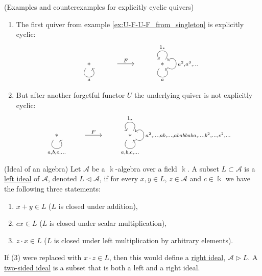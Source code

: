 \begin{example}{(Examples and counterexamples for explicitly cyclic quivers)}
\begin{enumerate}
not explicitly cyclic.
\item The first quiver from example \ref{ex:U-F-U-F_from_singleton} is explicitly cyclic:\\
\[
\begin{tikzcd}
\ast \arrow["a"', loop, distance=2em, in=305, out=235] & {} \arrow[r, "F"] & {} & \ast \arrow["a"', loop, distance=2em, in=305, out=235] \arrow["1_{\ast}"', loop, distance=2em, in=125, out=55] \arrow["{{a^{2}, a^{3},\dots}}"', loop, distance=2em, in=35, out=325]
\end{tikzcd}
\]
\item But after another forgetful functor $U$ the underlying quiver is not explicitly cyclic:\\
\[
\begin{tikzcd}
\ast \arrow["{a, b, c,\dots}"', loop, distance=2em, in=305, out=235] & {} \arrow[r, "F"] & {} & \ast \arrow["{a, b, c,\dots}"', loop, distance=2em, in=305, out=235] \arrow["1_{\ast}"', loop, distance=2em, in=125, out=55] \arrow["{a^{2},\dots,ab,\dots,ababbaba,\dots,b^{2},\dots,c^{2},\dots}"', loop, distance=2em, in=35, out=325]
\end{tikzcd}
\]
\end{enumerate}
\end{example}

\begin{definition}{(Ideal of an algebra)}\label{def:ideal_of_algebra}
Let $\mathcal{A}$ be a $\Bbbk$-algebra over a field $\Bbbk$.
A subset $L \subset \mathcal{A}$ is a \ul{left ideal} of $\mathcal{A}$, denoted $L \vartriangleleft \mathcal{A}$, if for every $x, y \in L$,
$z \in \mathcal{A}$ and $c \in \Bbbk$ we have the following three statements:
\begin{enumerate}
\renewcommand{\labelenumi}{(\theenumi)}
\item $x + y \in L$ ($L$ is closed under addition),
\item $cx \in L$ ($L$ is closed under scalar multiplication),
\item $z \cdot x \in L$ ($L$ is closed under left multiplication by arbitrary elements).
\end{enumerate}
\noindent If (3) were replaced with $x \cdot z \in L$, then this would define a \ul{right ideal}, $\mathcal{A} \vartriangleright L$.
A \ul{two-sided ideal} is a subset that is both a left and a right ideal.
\end{definition}

